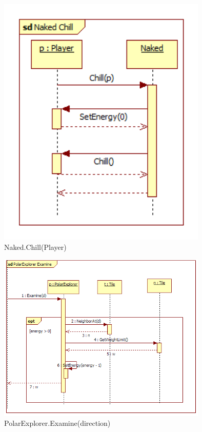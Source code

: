 \begin{figure}[H]
	\begin{center}
		\includegraphics[width=10cm]{chapters/chapter03/seqdiag/Naked_Chill.png}
		\caption{Naked.Chill(Player)}
		\label{fig:NakedChill}
	\end{center}
\end{figure}
\begin{figure}[H]
	\begin{center}
		\includegraphics[width=10cm]{chapters/chapter03/seqdiag/PolarExplorer_Examine.png}
		\caption{PolarExplorer.Examine(direction)}
		\label{fig:PolarExplorerExamine}
	\end{center}
\end{figure}
